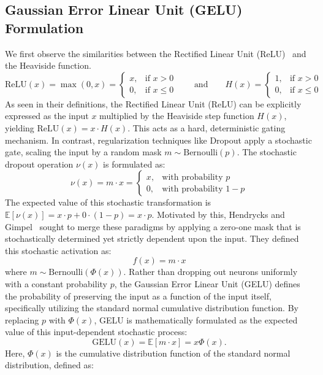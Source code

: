 \documentclass[11pt]{article}
\begin{document}
\subsection{Gaussian Error Linear Unit (GELU) Formulation}
\noindent We first observe the similarities between the Rectified Linear Unit (ReLU)~\cite{nair2010rectified} and the Heaviside function.
\begin{equation*}
\text{ReLU}(x) = \max(0, x) = 
\begin{cases} 
    x, & \text{if } x > 0 \\ 
    0, & \text{if } x \leq 0 
\end{cases}
\qquad \text{and} \qquad
H(x) = 
\begin{cases} 
    1, & \text{if } x > 0 \\ 
    0, & \text{if } x \leq 0 
\end{cases}
\end{equation*}
\noindent As seen in their definitions, the Rectified Linear Unit (ReLU) can be explicitly expressed as the input $x$ multiplied by the Heaviside step function $H(x)$, yielding $\text{ReLU}(x) = x \cdot H(x)$. This acts as a hard, deterministic gating mechanism. In contrast, regularization techniques like Dropout apply a stochastic gate, scaling the input by a random mask $m \sim \text{Bernoulli}(p)$. The stochastic dropout operation $\nu(x)$ is formulated as:
$$
\nu(x) = m \cdot x = 
\begin{cases} 
    x, & \text{with probability } p \\ 
    0, & \text{with probability } 1 - p 
\end{cases}
$$
The expected value of this stochastic transformation is $\mathbb{E}[\nu(x)] = x \cdot p + 0 \cdot (1-p) = x \cdot p$. Motivated by this, Hendrycks and Gimpel~\cite{hendrycks2023gaussianerrorlinearunits} sought to merge these paradigms by applying a zero-one mask that is stochastically determined yet strictly dependent upon the input. They defined this stochastic activation as:
$$
f(x) = m \cdot x
$$
where $m \sim \text{Bernoulli}(\Phi(x))$. Rather than dropping out neurons uniformly with a constant probability $p$, the Gaussian Error Linear Unit (GELU) defines the probability of preserving the input as a function of the input itself, specifically utilizing the standard normal cumulative distribution function. By replacing $p$ with $\Phi(x)$, GELU is mathematically formulated as the expected value of this input-dependent stochastic process: 
$$
\text{GELU}(x) = \mathbb{E}[m \cdot x] = x \Phi(x).
$$
Here, $\Phi(x)$ is the cumulative distribution function of the standard normal distribution, defined as:
\end{document}
